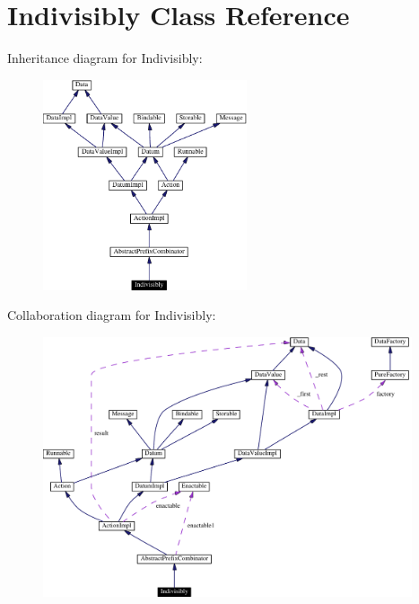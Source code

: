 \hypertarget{classIndivisibly}{
\section{Indivisibly  Class Reference}
\label{classIndivisibly}
}
Inheritance diagram for Indivisibly:\begin{figure}[H]
\begin{center}
\leavevmode
\includegraphics[width=170pt]{classIndivisibly__inherit__graph}
\end{center}
\end{figure}
Collaboration diagram for Indivisibly:\begin{figure}[H]
\begin{center}
\leavevmode
\includegraphics[width=308pt]{classIndivisibly__coll__graph}
\end{center}
\end{figure}
